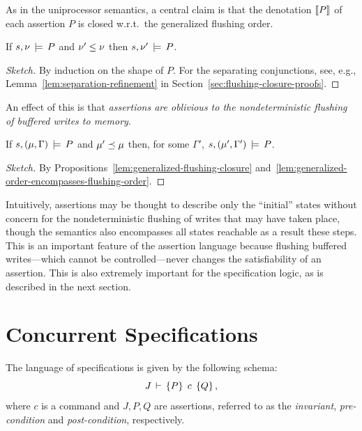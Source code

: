 \documentclass[11pt]{report}         %
\begin{document}
As in the uniprocessor semantics, a central claim is that the denotation $[\![P]\!]$ of each assertion $P$ is closed w.r.t.\ the generalized flushing order. 

\begin{proposition}
  \label{lem:generalized-flushing-closure}
  If $s,\nu \,\models\, P$ and $\nu' \leq \nu$ then $s,\nu' \,\models\, P$. 
\end{proposition}

\begin{proof}[Sketch]
    By induction on the shape of $P$. For the separating conjunctions, see, e.g., Lemma~\ref{lem:separation-refinement} in Section~\ref{sec:flushing-closure-proofs}. 
\end{proof}

An effect of this is that \emph{assertions are oblivious to the nondeterministic flushing of buffered writes to memory}. 

\begin{corollary}
    \label{lem:flushing-closure}
    If $s,(\mu,\Gamma) \,\models\, P$ and $\mu' \preceq \mu$ then, for some $\Gamma'$, $s,(\mu',\Gamma') \,\models\, P$. 
\end{corollary}

\begin{proof}[Sketch]
    By Propositions~\ref{lem:generalized-flushing-closure} and~\ref{lem:generalized-order-encompasses-flushing-order}. 
\end{proof}

Intuitively, assertions may be thought to describe only the ``initial'' states without concern for the nondeterministic flushing of writes that may have taken place, though the semantics also encompasses all states reachable as a result these steps. This is an important feature of the assertion language because flushing buffered writes---which cannot be controlled---never changes the satisfiability of an assertion. This is also extremely important for the specification logic, as is described in the next section. 

\section{Concurrent Specifications}
\label{sec:specifications}
\label{sec:multiprocessor-specifications}

The language of specifications is given by the following schema: \[ J\,\vdash\,\left\lbrace P \right\rbrace\;c\;\left\lbrace Q \right\rbrace, \] where $c$ is a command and $J,P,Q$ are assertions, referred to as the \emph{invariant}, \emph{pre-condition} and \emph{post-condition}, respectively. 
\end{document}

